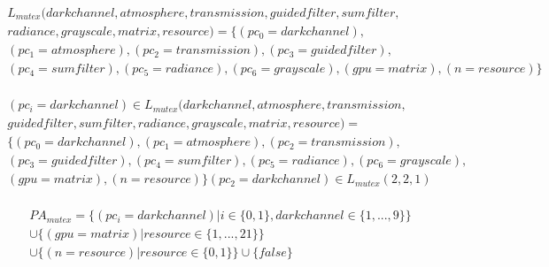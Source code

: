 \documentclass{jsarticle}
\begin{document}
\begin{equation}
\begin{split}
\begin{gathered}
L_{mutex}(darkchannel, atmosphere, transmission, guidedfilter, sumfilter, \\
radiance, grayscale,matrix, resource)=\bigl\{(pc_0=darkchannel), \\
(pc_1=atmosphere),(pc_2=transmission),(pc_3=guidedfilter), \\
(pc_4=sumfilter),(pc_5=radiance),(pc_6=grayscale),(gpu=matrix), (n=resource)\bigr\}
\end{gathered}
\end{split}
\end{equation}

\begin{equation}
\begin{split}
\begin{gathered}
(pc_i=darkchannel) \in L_{mutex}(darkchannel, atmosphere, transmission, \\
guidedfilter, sumfilter,radiance, grayscale, matrix, resource)= \\ 
\bigl\{(pc_0=darkchannel),(pc_1=atmosphere),(pc_2=transmission), \\
(pc_3=guidedfilter),(pc_4=sumfilter),(pc_5=radiance),(pc_6=grayscale),\\
(gpu=matrix), (n=resource)\bigr\} (pc_2=darkchannel) \in L_{mutex}(2, 2, 1)
\end{gathered}
\end{split}
\end{equation}

\begin{equation}
\begin{split}
\begin{gathered}
PA_{mutex}=\bigl\{(pc_i=darkchannel) | i \in\bigl\{0, 1\bigr\}, darkchannel \in \bigl\{1,...,9\bigr\}\bigr\} \\
\cup \bigl\{(gpu=matrix) | resource \in \bigl\{1,...,21\bigr\}\bigr\} \\
\cup \bigl\{(n=resource) | resource \in \bigl\{0, 1\bigr\} \bigr\} \cup \bigl\{false\bigr\}
\end{gathered}
\end{split}
\end{equation}
\end{document}
